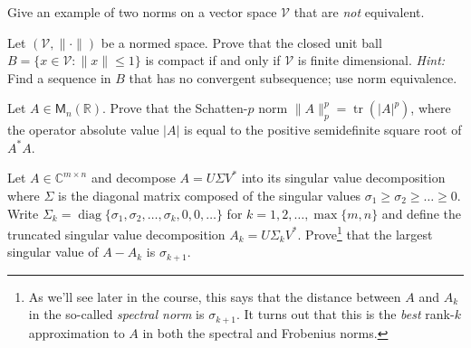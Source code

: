 \documentclass[12pt,letterpaper,cm]{hmcpset}
\begin{document}
\begin{problem}[1]
    Give an example of two norms on a vector space $\mathcal{V}$ that are \emph{not} equivalent.
\end{problem}

\begin{solution}
    \vfill
\end{solution}

\begin{problem}[2]
    Let $(\mathcal{V},\|\cdot\|)$ be a normed space. Prove that
    the closed unit ball $B = \{x\in \mathcal{V} : \|x\|\leq 1\}$ is compact if and
    only if $\mathcal{V}$ is finite dimensional. \textit{Hint:} Find a sequence in
    $B$ that has no convergent subsequence; use norm equivalence.
\end{problem}

\begin{solution}
    \vfill
\end{solution}

\begin{problem}[3]
    Let $A\in\mathsf{M}_n(\mathbb{R})$. Prove that the Schatten-$p$ norm
    $\|A\|_p^p = \operatorname{tr}(|A|^p)$, where the operator absolute value
    $|A|$ is equal to the positive semidefinite square root of $A^*A$.
\end{problem}

\begin{solution}
    \vfill
\end{solution}

\begin{problem}[4]
    Let $A\in\mathbb{C}^{m\times n}$ and decompose $A = U \Sigma V^*$ into its singular value
    decomposition where $\Sigma$ is the diagonal matrix composed of the singular values
    $\sigma_1\geq\sigma_2\geq \dots\geq 0$. Write $\Sigma_k = \operatorname{diag}\{\sigma_1,\sigma_2
    ,\ldots,\sigma_k,0,0,\ldots\}$ for $k=1,2,\ldots,\max\{m,n\}$ and define the truncated singular value decomposition
    $A_k = U\Sigma_k V^*$. Prove\footnote{As we'll see later in the course, this says that the distance between
    $A$ and $A_k$ in the so-called \emph{spectral norm} is $\sigma_{k+1}$. It turns out that this is the
    \emph{best} rank-$k$ approximation to $A$ in both the spectral and Frobenius norms.}
    that the largest singular value of $A - A_k$ is $\sigma_{k+1}$.
\end{problem}

\begin{solution}
    \vfill
\end{solution}
\end{document}
